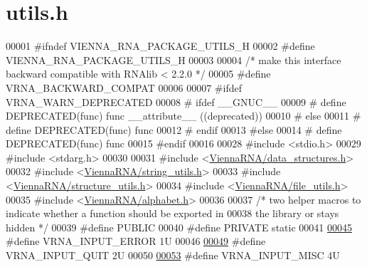 \hypertarget{utils_8h_source}{}\section{utils.\+h}
\label{utils_8h_source}

\begin{DoxyCode}
00001 \textcolor{preprocessor}{#ifndef VIENNA\_RNA\_PACKAGE\_UTILS\_H}
00002 \textcolor{preprocessor}{#define VIENNA\_RNA\_PACKAGE\_UTILS\_H}
00003 
00004 \textcolor{comment}{/* make this interface backward compatible with RNAlib < 2.2.0 */}
00005 \textcolor{preprocessor}{#define VRNA\_BACKWARD\_COMPAT}
00006 
00007 \textcolor{preprocessor}{#ifdef VRNA\_WARN\_DEPRECATED}
00008 \textcolor{preprocessor}{# ifdef \_\_GNUC\_\_}
00009 \textcolor{preprocessor}{#  define DEPRECATED(func) func \_\_attribute\_\_ ((deprecated))}
00010 \textcolor{preprocessor}{# else}
00011 \textcolor{preprocessor}{#  define DEPRECATED(func) func}
00012 \textcolor{preprocessor}{# endif}
00013 \textcolor{preprocessor}{#else}
00014 \textcolor{preprocessor}{# define DEPRECATED(func) func}
00015 \textcolor{preprocessor}{#endif}
00016 
00028 \textcolor{preprocessor}{#include <stdio.h>}
00029 \textcolor{preprocessor}{#include <stdarg.h>}
00030 
00031 \textcolor{preprocessor}{#include <\hyperlink{data__structures_8h}{ViennaRNA/data\_structures.h}>}
00032 \textcolor{preprocessor}{#include <\hyperlink{string__utils_8h}{ViennaRNA/string\_utils.h}>}
00033 \textcolor{preprocessor}{#include <\hyperlink{structure__utils_8h}{ViennaRNA/structure\_utils.h}>}
00034 \textcolor{preprocessor}{#include <\hyperlink{file__utils_8h}{ViennaRNA/file\_utils.h}>}
00035 \textcolor{preprocessor}{#include <\hyperlink{alphabet_8h}{ViennaRNA/alphabet.h}>}
00036 
00037 \textcolor{comment}{/* two helper macros to indicate whether a function should be exported in}
00038 \textcolor{comment}{the library or stays hidden */}
00039 \textcolor{preprocessor}{#define PUBLIC}
00040 \textcolor{preprocessor}{#define PRIVATE static}
00041 
\hyperlink{group__utils_gad403c9ea58f1836689404c2931419c8c}{00045} \textcolor{preprocessor}{#define VRNA\_INPUT\_ERROR                  1U}
00046 
\hyperlink{group__utils_ga72f3c6ca5c83d2b9baed2922d19c403d}{00049} \textcolor{preprocessor}{#define VRNA\_INPUT\_QUIT                   2U}
00050 
\hyperlink{group__utils_ga8e3241b321c9c1a78a69e59e2e019a71}{00053} \textcolor{preprocessor}{#define VRNA\_INPUT\_MISC                   4U}

\end{DoxyCode}
